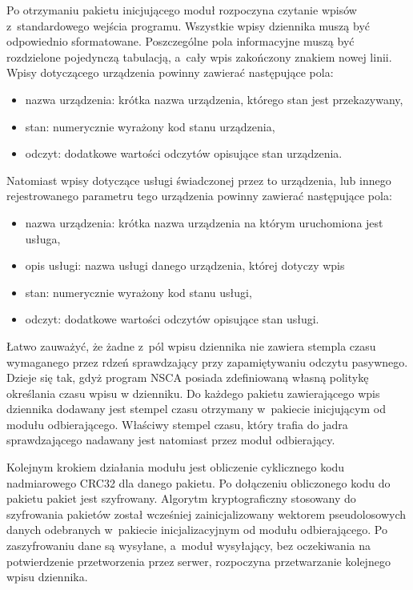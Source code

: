 Po otrzymaniu pakietu inicjującego moduł rozpoczyna czytanie wpisów
z~standardowego wejścia programu. Wszystkie wpisy dziennika muszą być
odpowiednio sformatowane. Poszczególne pola informacyjne muszą być
rozdzielone pojedynczą tabulacją, a~cały wpis zakończony znakiem
nowej linii. Wpisy dotyczącego urządzenia powinny zawierać następujące
pola:

\begin{itemize}
\item nazwa urządzenia: krótka nazwa urządzenia, którego stan jest
  przekazywany,
\item stan: numerycznie wyrażony kod stanu urządzenia,
\item odczyt: dodatkowe wartości odczytów opisujące stan urządzenia.
\end{itemize}

Natomiast wpisy dotyczące usługi świadczonej przez to urządzenia, lub
innego rejestrowanego parametru tego urządzenia powinny zawierać
następujące pola:

\begin{itemize}
\item nazwa urządzenia: krótka nazwa urządzenia na którym uruchomiona
  jest usługa,
\item opis usługi: nazwa usługi danego urządzenia, której dotyczy wpis
\item stan: numerycznie wyrażony kod stanu usługi,
\item odczyt: dodatkowe wartości odczytów opisujące stan usługi.
\end{itemize}

Łatwo zauważyć, że żadne z~pól wpisu dziennika nie zawiera stempla
czasu wymaganego przez rdzeń sprawdzający przy zapamiętywaniu odczytu
pasywnego. Dzieje się tak, gdyż program NSCA posiada zdefiniowaną
własną politykę określania czasu wpisu w dzienniku. Do każdego pakietu
zawierającego wpis dziennika dodawany jest stempel czasu otrzymany
w~pakiecie inicjującym od modułu odbierającego. Właściwy stempel czasu,
który trafia do jadra sprawdzającego nadawany jest natomiast przez
moduł odbierający.

Kolejnym krokiem działania modułu jest obliczenie cyklicznego kodu
nadmiarowego CRC32 dla danego pakietu. Po dołączeniu obliczonego kodu
do pakietu pakiet jest szyfrowany. Algorytm kryptograficzny stosowany do
szyfrowania pakietów został wcześniej zainicjalizowany wektorem
pseudolosowych danych odebranych w~pakiecie inicjalizacyjnym od modułu
odbierającego. Po zaszyfrowaniu dane są wysyłane, a~moduł wysyłający,
bez oczekiwania na potwierdzenie przetworzenia przez serwer,
rozpoczyna przetwarzanie kolejnego wpisu dziennika.

